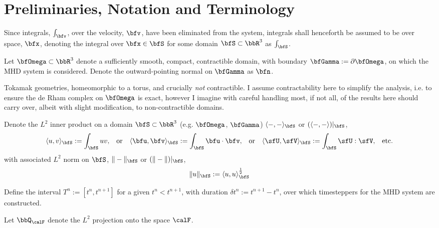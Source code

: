 \section*{Preliminaries, Notation and Terminology}
    Since integrals, $\int_{\bfv}$, over the velocity, $\bfv$, have been eliminated from the system, integrals shall henceforth be assumed to be over space, $\bfx$, denoting the integral over $\bfx  \in  \bfS$ for some domain $\bfS  \subset  \bbR^{3}$ as $\int_{\bfS}$.

    Let $\bfOmega  \subset  \bbR^{3}$ denote a sufficiently smooth, compact, contractible domain, with boundary $\bfGamma  :=  \partial\bfOmega$, on which the MHD system is considered. Denote the outward-pointing normal on $\bfGamma$ as $\bfn$.

    \begin{remark}
        Tokamak geometries, homeomorphic to a torus, and crucially \emph{not} contractible. I assume contractability here to simplify the analysis, i.e. to ensure the de Rham complex on $\bfOmega$ is exact, however I imagine with careful handling most, if not all, of the results here should carry over, albeit with slight modification, to non-contractible domains.
    \end{remark}
    
    Denote the $L^{2}$ inner product on a domain $\bfS  \subset  \bbR^{3}$ (e.g. $\bfOmega$, $\bfGamma$) $\langle-, -\rangle_{\bfS}$ or $(\langle-, -\rangle)|_{\bfS}$,
    \begin{align}
        \langle u,    v   \rangle_{\bfS}  :=  \int_{\bfS}uv,  &&
        \text{or}  &&
        \langle \bfu, \bfv\rangle_{\bfS}  :=  \int_{\bfS}\bfu\cdot\bfv,  &&
        \text{or}  &&
        \langle \sfU, \sfV\rangle_{\bfS}  :=  \int_{\bfS}\sfU:\sfV,  &&
        \text{etc.}
    \end{align}
    with associated $L^{2}$ norm on $\bfS$, $\|-\|_{\bfS}$ or $(\|-\|)|_{\bfS}$,
    \begin{equation}
        \|u\|_{\bfS}  :=  \langle u, u\rangle_{\bfS}^{\frac{1}{2}}
    \end{equation}

    Define the interval $T^{n}  :=  \left[t^{n}, t^{n + 1}\right]$ for a given $t^{n}  <  t^{n + 1}$, with duration $\delta t^{n}  :=  t^{n + 1} - t^{n}$, over which timesteppers for the MHD system are constructed.

    Let $\bbQ_{\calF}$ denote the $L^{2}$ projection onto the space $\calF$.
    
